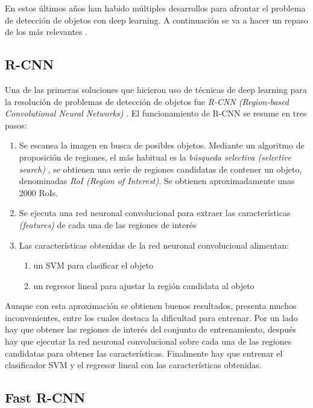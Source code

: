 En estos últimos años han habido múltiples desarrollos para afrontar el problema de detección de objetos con deep learning. A continuación se va a hacer un repaso de los más relevantes \cite{s2_stateofart1} \cite{s2_stateofart2} \cite{s2_stateofart5} \cite{s2_stateofart6} \cite{s2_stateofart7}.

\subsection*{R-CNN}

Una de las primeras soluciones que hicieron uso de técnicas de deep learning para la resolución de problemas de detección de objetos fue \textit{R-CNN (Region-based Convolutional Neural Networks)} \cite{s2_stateofart_rcnn}. El funcionamiento de R-CNN se resume en tres pasos:

\begin{enumerate}
	\item Se escanea la imagen en busca de posibles objetos. Mediante un algoritmo de proposición de regiones, el más habitual es la \textit{búsqueda selectiva (selective search)} \cite{s2_stateofart_selectivesearch}, se obtienen una serie de regiones candidatas de contener un objeto, denominadas \textit{RoI (Region of Interest)}. Se obtienen aproximadamente unas 2000 RoIs.
	\item Se ejecuta una red neuronal convolucional para extraer las características \textit{(features)} de cada una de las regiones de interés
	\item Las características obtenidas de la red neuronal convolucional alimentan:
	\begin{enumerate}
		\item un SVM para clasificar el objeto
		\item un regresor lineal para ajustar la región candidata al objeto
	\end{enumerate}
\end{enumerate}

Aunque con esta aproximación se obtienen buenos resultados, presenta muchos inconvenientes, entre los cuales destaca la dificultad para entrenar. Por un lado hay que obtener las regiones de interés del conjunto de entrenamiento, después hay que ejecutar la red neuronal convolucional sobre cada una de las regiones candidatas para obtener las características. Finalmente hay que entrenar el clasificador SVM y el regresor lineal con las características obtenidas.

\subsection*{Fast R-CNN}

